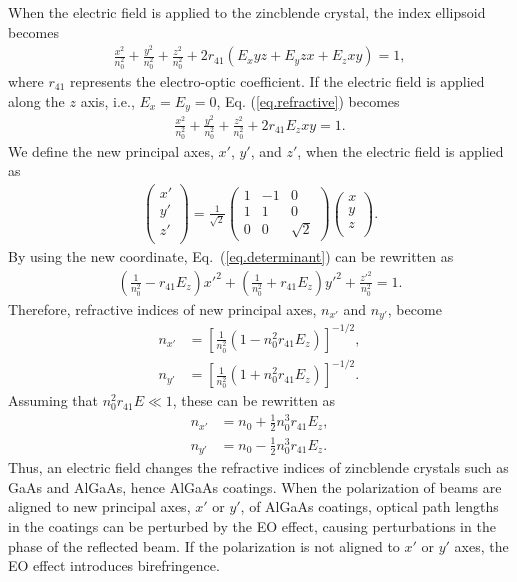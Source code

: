 When the electric field is applied to the zincblende crystal, the index ellipsoid becomes~\cite{Namba1961,yariv}
\begin{align}
    \frac{x^2}{n_0^2} + \frac{y^2}{n_0^2} + \frac{z^2}{n_0^2} + 2r_{41}(E_{x}yz + E_{y}zx +E_{z}xy) = 1,
    \label{eq.refractive}
\end{align}
where $r_{41}$ represents the electro-optic coefficient.
If the electric field is applied along the $z$ axis, i.e., $E_x=E_y=0$, Eq. (\ref{eq.refractive}) becomes
\begin{align}
    \frac{x^2}{n_0^2} + \frac{y^2}{n_0^2} + \frac{z^2}{n_0^2} + 2r_{41}E_zxy = 1.
    \label{eq.determinant}
\end{align}
We define the new principal axes, $x'$, $y'$, and $z'$, when the electric field is applied as
\begin{align}
    \begin{pmatrix}
    x' \\ y' \\ z' \\
    \end{pmatrix}
    = \frac{1}{\sqrt{2}}
    \begin{pmatrix}
    1 & -1 & 0 \\ 1 & 1 & 0 \\ 0 & 0 & \sqrt{2}
    \end{pmatrix}
    \begin{pmatrix}
    x \\ y \\ z \\
    \end{pmatrix}.
\end{align}
By using the new coordinate, Eq.~(\ref{eq.determinant}) can be rewritten as
\begin{align}
     \left(\frac{1}{n_0^2}-r_{41}E_z\right)x'^2 + \left(\frac{1}{n_0^2}+r_{41}E_z\right)y'^2 + \frac{z'^2}{n_0^2} = 1.
\end{align}
Therefore, refractive indices of new principal axes, $n_{x'}$ and $n_{y'}$, become 
\begin{align}
    n_{x'} &= \left[\frac{1}{n_0^2}\left(1-n_0^2r_{41}E_z\right)\right]^{-1/2}, \\
    n_{y'} &= \left[\frac{1}{n_0^2}\left(1+n_0^2r_{41}E_z\right)\right]^{-1/2}.
\end{align}
Assuming that $n_0^2r_{41}E \ll 1$, these can be rewritten as
\begin{align}
    n_{x'} &= n_0 + \frac{1}{2}n_0^3r_{41}E_z, \\
    n_{y'} &= n_0 - \frac{1}{2}n_0^3r_{41}E_z.
\end{align}
Thus, an electric field changes the refractive indices of zincblende crystals such as GaAs and AlGaAs, hence AlGaAs coatings.
When the polarization of beams are aligned to new principal axes, $x'$ or $y'$, of AlGaAs coatings, optical path lengths in the coatings can be perturbed by the EO effect, causing perturbations in the phase of the reflected beam.
If the polarization is not aligned to $x'$ or $y'$ axes, the EO effect introduces birefringence.

